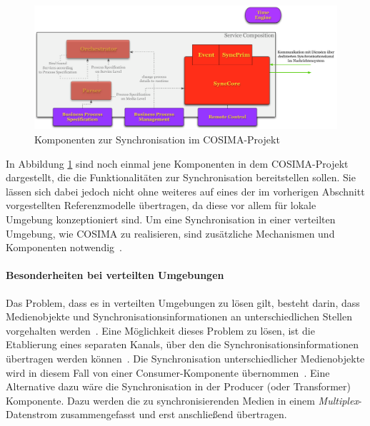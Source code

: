   
\label{msec:umsetzung_in_cosima}

  \begin{figure}[!ht]
    \centering
      \includegraphics[width=.9\textwidth]{images/Servicekomposition_syncpart.pdf}
    \caption{Komponenten zur Synchronisation im COSIMA-Projekt}
    \label{fig:images_Servicekomposition_syncpart}
  \end{figure}
  
  In Abbildung \ref{fig:images_Servicekomposition_syncpart} sind noch einmal jene Komponenten in dem COSIMA-Projekt dargestellt, die die Funktionalitäten zur Synchronisation bereitstellen sollen. Sie lässen sich dabei jedoch nicht ohne weiteres auf eines der im vorherigen Abschnitt vorgestellten Referenzmodelle übertragen, da diese vor allem für lokale Umgebung konzeptioniert sind. Um eine Synchronisation in einer verteilten Umgebung, wie COSIMA zu realisieren, sind zusätzliche Mechanismen und Komponenten notwendig~\citep[S. 608ff]{multimedia_technologie}. 
  
\paragraph{Besonderheiten bei verteilten Umgebungen} %
\label{par:besonderheiten_bei_verteilten_umgebungen}

  Das Problem, dass es in verteilten Umgebungen zu lösen gilt, besteht darin, dass Medienobjekte und Synchronisationsinformationen an unterschiedlichen Stellen vorgehalten werden~\citep[S. 607]{multimedia_technologie}. Eine Möglichkeit dieses Problem zu lösen, ist die Etablierung eines separaten Kanals, über den die Synchronisationsinformationen übertragen werden können~\citep[S. 608]{multimedia_technologie}. Die Synchronisation unterschiedlicher Medienobjekte wird in diesem Fall von einer Consumer-Komponente übernommen~\citep[S. 608]{multimedia_technologie}. Eine Alternative dazu wäre die Synchronisation in der Producer (oder Transformer) Komponente. Dazu werden die zu synchronisierenden Medien in einem \emph{Multiplex}-Datenstrom zusammengefasst und erst anschließend übertragen.
  
